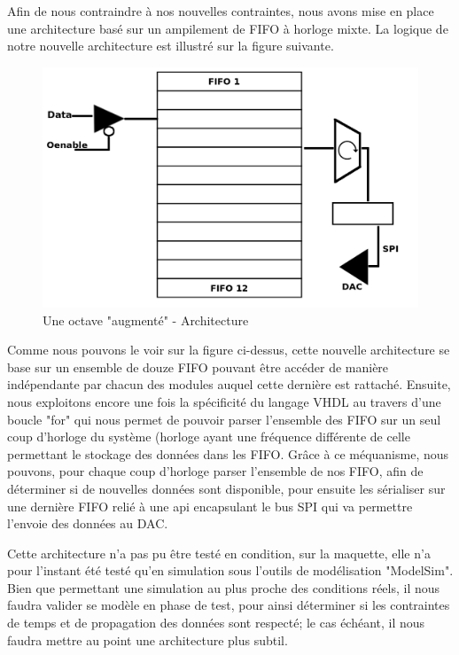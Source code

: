 \documentclass[french,a4paper,12pt]{report}
\begin{document}
		Afin de nous contraindre à nos nouvelles contraintes, nous avons mise en place une architecture basé sur un ampilement de FIFO à horloge mixte. La logique de notre nouvelle architecture est illustré sur la figure suivante.
		
	\begin{figure}[!ht]
    \center
  	\includegraphics[width=12cm]{octave.png}
		\caption{Une octave "augmenté" - Architecture}
	\end{figure}
		
		Comme nous pouvons le voir sur la figure ci-dessus, cette nouvelle architecture se base sur un ensemble de douze FIFO pouvant être accéder de manière indépendante par chacun des modules auquel cette dernière est rattaché. Ensuite, nous exploitons encore une fois la spécificité du langage VHDL au travers d'une boucle "for" qui nous permet de pouvoir parser l'ensemble des FIFO sur un seul coup d'horloge du système (horloge ayant une fréquence différente de celle permettant le stockage des données dans les FIFO.
		Grâce à ce méquanisme, nous pouvons, pour chaque coup d'horloge parser l'ensemble de nos FIFO, afin de déterminer si de nouvelles données sont disponible, pour ensuite les sérialiser sur une dernière FIFO relié à une api encapsulant le bus SPI qui va permettre l'envoie des données au DAC.
		
		Cette architecture n'a pas pu être testé en condition, sur la maquette, elle n'a pour l'instant été testé qu'en simulation sous l'outils de modélisation "ModelSim". Bien que permettant une simulation au plus proche des conditions réels, il nous faudra valider se modèle en phase de test, pour ainsi déterminer si les contraintes de temps et de propagation des données sont respecté; le cas échéant, il nous faudra mettre au point une architecture plus subtil.
	
\end{document}
